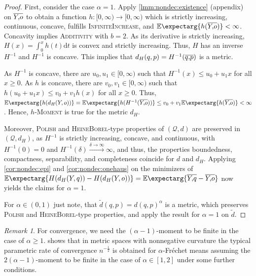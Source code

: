 \documentclass{scrartcl}
\newcommand{\Ex}{\E\expectarg}
\newcommand*{\mc}[1]{\mathcal{#1}}
\newcommand{\dl}{\mathrm{d}}
\theoremstyle{plain}\newtheorem{theorem}{Theorem}[section]
\theoremstyle{definition}
\theoremstyle{remark}
\newtheorem{remark}[theorem]{Remark}
\begin{document}
\begin{proof}
First, consider the case $\alpha=1$.
Apply \autoref{lmm:nondec:existence} (appendix) on $\overline{Y,\!o}$ to obtain a function $h \colon [0,\infty) \to [0,\infty)$ which is strictly increasing, continuous, concave, fulfills \textsc{InfiniteIncrease}, and $\Ex{h(\ol Yo)} < \infty$. Concavity implies \textsc{Additivity} with $b=2$.
As its derivative is strictly increasing, $H(x) = \int_0^x h(t) \dl t$ is convex and strictly increasing. Thus, $H$ has an inverse $H^{-1}$ and $H^{-1}$ is concave. 
This implies that $d_H(q,p) = H^{-1}(\overline{q,\!p})$ is a metric. 

As $H^{-1}$ is concave, there are $u_0, u_1 \in[0,\infty)$ such that $H^{-1}(x) \leq u_0 + u_1 x$ for all $x\geq0$.
As $h$ is concave, there are $v_0, v_1\in[0,\infty)$ such that $h(u_0 + u_1 x) \leq v_0 + v_1 h(x)$ for all $x\geq 0$.
Thus, $\Ex{h(d_H(Y, o))} = \Ex{h(H^{-1} (\ol Yo))} \leq v_0 + v_1 \Ex{h(\ol Yo)} < \infty$.
Hence, \textsc{$h$-Moment} is true for the metric $d_H$.

Moreover, \textsc{Polish} and \textsc{HeineBorel}-type properties of $(\mc Q, d)$ are preserved in $(\mc Q, d_H)$, as $H^{-1}$ is strictly increasing, concave, and continuous, with $H^{-1}(0) = 0$ and $H^{-1}(\delta)\xrightarrow{\delta\to\infty}\infty$, and thus, the properties boundedness, compactness, separability, and completeness coincide for $d$ and $d_H$.
Applying \autoref{cor:nondec:epi} and \autoref{cor:nondec:onehaus} on the minimizers of $\Ex{H(d_H(Y, q)) - H(d_H(Y, o))}  = \Ex{\ol  Yq - \ol Yo}$ now yields the claims for $\alpha=1$.

For $\alpha \in (0,1)$ just note, that $\tilde d(q,p) = d(q,p)^\alpha$ is a metric, which preserves \textsc{Polish} and \textsc{HeineBorel}-type properties, and apply the result for $\alpha = 1$ on $\tilde d$.
\end{proof}
\begin{remark}
	 For convergence, we need the $(\alpha-1)$-moment to be finite in the case of $\alpha \geq 1$. \cite[Corollary 5]{schoetz19} shows that in metric spaces with nonnegative curvature the typical parametric rate of convergence $n^{-\frac{1}{2}}$ is obtained for $\alpha$-Fréchet means assuming the $2(\alpha-1)$-moment to be finite in the case of $\alpha\in[1,2]$ under some further conditions.
\end{remark}
\end{document}
